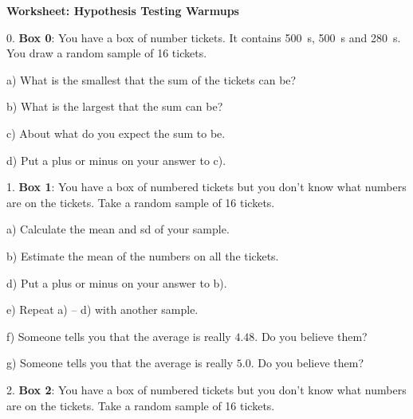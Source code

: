 \documentclass[10pt]{article}
\begin{document}
{\setlength{\baselineskip}{1.05\baselineskip}
\begin{center}
\textbf{\large  Worksheet:  Hypothesis Testing Warmups}
\end{center}

0. \textbf{Box 0}: You have a box of number tickets.  It contains 500 \,s, 500 \,s
and 280  \,s. You draw a random sample of 16 tickets.

\hspace{10pt} a) What is the smallest that the sum of the tickets can be?
\bigskip

\hspace{10pt} b) What is the largest that the sum can be?
\bigskip

\hspace{10pt} c) About what do you expect the sum to be.
\vspace{.5in}

\hspace{10pt} d) Put a plus or minus on your answer to c).  
\vspace{.7in}

1. \textbf{Box 1}: You have a box of numbered tickets but you don't know what numbers are on the tickets.
Take a random sample of 16 tickets.

\hspace{10pt} a) Calculate the mean and sd of your sample.
\vspace{.5in}

\hspace{10pt} b) Estimate the mean of the numbers on all the tickets.
\vspace{.5in}

\hspace{10pt} d) Put a plus or minus on your answer to b).  
\vspace{.7in}

\hspace{10pt} e) Repeat a) -- d) with another sample.  
\vspace{1in}

\hspace{10pt} f) Someone tells you that the average is really $4.48$.   Do you believe them?  
\vspace{.5in}

\hspace{10pt} g) Someone tells you that the average is really $5.0$.   Do you believe them?  
\vfill
\eject
{\ }

2. \textbf{Box 2}: You have a box of numbered tickets but you don't know what numbers are on the tickets.
Take a random sample of 16 tickets.

}
\end{document}
